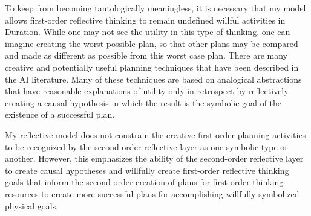 To keep from becoming tautologically meaningless, it is necessary that
my model allows first-order reflective thinking to remain undefined
willful activities in Duration.  While one may not see the utility in
this type of thinking, one can imagine creating the worst possible
plan, so that other plans may be compared and made as different as
possible from this worst case plan.  There are many creative and
potentially useful planning techniques that have been described in the
AI literature.  Many of these techniques are based on analogical
abstractions that have reasonable explanations of utility only in
retrospect by reflectively creating a causal hypothesis in which the
result is the symbolic goal of the existence of a successful plan.

My reflective model does not constrain the creative first-order
planning activities to be recognized by the second-order reflective
layer as one symbolic type or another.  However, this emphasizes the
ability of the second-order reflective layer to create causal
hypotheses and willfully create first-order reflective thinking goals
that inform the second-order creation of plans for first-order
thinking resources to create more successful plans for accomplishing
willfully symbolized physical goals.

